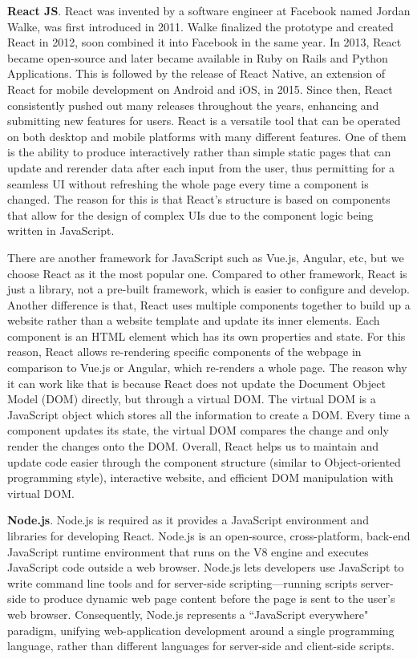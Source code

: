 \bigskip
{\textbf{React JS}}. React was invented by a software engineer at Facebook named Jordan Walke, was first introduced in 2011. Walke finalized the prototype and created React in 2012, soon combined it into Facebook in the same year. In 2013, React became open-source and later became available in Ruby on Rails and Python Applications. This is followed by the release of React Native, an extension of React for mobile development on Android and iOS, in 2015. Since then, React consistently pushed out many releases throughout the years, enhancing and submitting new features for users. React is a versatile tool that can be operated on both desktop and mobile platforms with many different features. One of them is the ability to produce interactively rather than simple static pages that can update and rerender data after each input from the user, thus permitting for a seamless UI without refreshing the whole page every time a component is changed. The reason for this is that React’s structure is based on components that allow for the design of complex UIs due to the component logic being written in JavaScript.

There are another framework for JavaScript such as Vue.js, Angular, etc, but we choose React as it the most popular one. Compared to other framework, React is just a library, not a pre-built framework, which is easier to configure and develop. Another difference is that, React uses multiple components together to build up a website rather than a website template and update its inner elements. Each component is an HTML element which has its own properties and state. For this reason, React allows re-rendering specific components of the webpage in comparison to Vue.js or Angular, which re-renders a whole page. The reason why it can work like that is because React does not update the Document Object Model (DOM) directly, but through a virtual DOM. The virtual DOM is a JavaScript object which stores all the information to create a DOM. Every time a component updates its state, the virtual DOM compares the change and only render the changes onto the DOM. Overall, React helps us to maintain and update code easier through the component structure (similar to Object-oriented programming style), interactive website, and efficient DOM manipulation with virtual DOM.

\bigskip
{\textbf{Node.js}}. Node.js is required as it provides a JavaScript environment and libraries for developing React. Node.js is an open-source, cross-platform, back-end JavaScript runtime environment that runs on the V8 engine and executes JavaScript code outside a web browser. Node.js lets developers use JavaScript to write command line tools and for server-side scripting—running scripts server-side to produce dynamic web page content before the page is sent to the user's web browser. Consequently, Node.js represents a ``JavaScript everywhere" paradigm, unifying web-application development around a single programming language, rather than different languages for server-side and client-side scripts.

